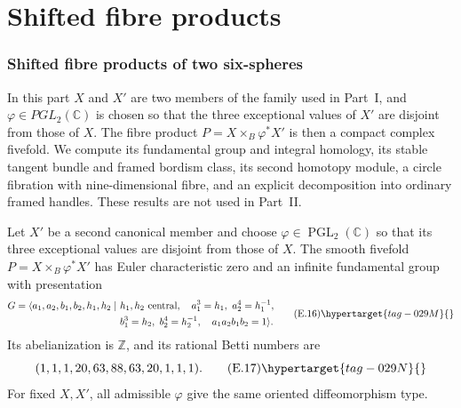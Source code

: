 \part{Shifted fibre products}
\section{Shifted fibre products of two six-spheres}\label{sec:shifted}

In this part $X$ and $X'$ are two members of the family used in
Part~I, and $\varphi\in PGL_2(\mathbb C)$ is chosen so that the three
exceptional values of $X'$ are disjoint from those of $X$.  The fibre
product $P=X\times_B\varphi^*X'$ is then a compact complex fivefold.  We
compute its fundamental group and integral homology, its stable tangent
bundle and framed bordism class, its second homotopy module, a circle
fibration with nine-dimensional fibre, and an explicit decomposition into
ordinary framed handles.  These results are not used in Part~II.

\begin{theorem}\hypertarget{tag-02MN}{}\label{maps:src:E.2.3}


Let $X'$ be a second canonical member and choose $\varphi\in
\operatorname{PGL}_2(\mathbb C)$ so that its three exceptional
values are disjoint from those of $X$.  The smooth fivefold
$P=X\times_B\varphi^*X'$ has Euler characteristic zero and
an infinite fundamental group with presentation
\[
\begin{split}
G=\langle a_1,a_2,b_1,b_2,h_1,h_2\mid\ &
 h_1,h_2\ \text{central},\quad
 a_1^3=h_1,\ a_2^4=h_1^{-1},\\
 &b_1^3=h_2,\ b_2^4=h_2^{-1},\quad
 a_1a_2b_1b_2=1\rangle .
\end{split}
\tag{E.16}\hypertarget{tag-029M}{}\label{maps:eq:E.16}
\]
Its abelianization is $\mathbb Z$, and its rational Betti numbers are
\[
 (1,1,1,20,63,88,63,20,1,1,1).
 \tag{E.17}\hypertarget{tag-029N}{}\label{maps:eq:E.17}
\]
For fixed $X,X'$, all admissible $\varphi$ give the same oriented
diffeomorphism type.

\end{theorem}


